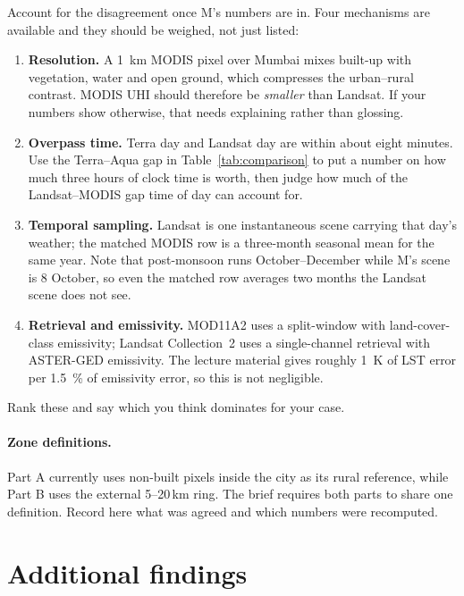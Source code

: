 \documentclass[11pt,a4paper]{article}
\newcommand\TODO{}
\begin{document}
\TODO{Account for the disagreement once M's numbers are in. Four
mechanisms are available and they should be weighed, not just listed:

\begin{enumerate}
  \item \textbf{Resolution.} A \SI{1}{\kilo\metre} MODIS pixel over
  Mumbai mixes built-up with vegetation, water and open ground, which
  compresses the urban--rural contrast. MODIS UHI should therefore be
  \emph{smaller} than Landsat. If your numbers show otherwise, that
  needs explaining rather than glossing.
  \item \textbf{Overpass time.} Terra day and Landsat day are within
  about eight minutes. Use the Terra--Aqua gap in
  Table~\ref{tab:comparison} to put a number on how much three hours
  of clock time is worth, then judge how much of the Landsat--MODIS
  gap time of day can account for.
  \item \textbf{Temporal sampling.} Landsat is one instantaneous scene
  carrying that day's weather; the matched MODIS row is a three-month
  seasonal mean for the same year. Note that post-monsoon runs
  October--December while M's scene is 8 October, so even the matched
  row averages two months the Landsat scene does not see.
  \item \textbf{Retrieval and emissivity.} MOD11A2 uses a split-window
  with land-cover-class emissivity; Landsat Collection~2 uses a
  single-channel retrieval with ASTER-GED emissivity. The lecture
  material gives roughly \SI{1}{\kelvin} of LST error per
  \SI{1.5}{\percent} of emissivity error, so this is not negligible.
\end{enumerate}

Rank these and say which you think dominates for your case.}

\paragraph{Zone definitions.}
\TODO{Part A currently uses non-built pixels inside the city as its
rural reference, while Part B uses the external 5--20\,km ring. The
brief requires both parts to share one definition. Record here what
was agreed and which numbers were recomputed.}

\section{Additional findings}
\end{document}
